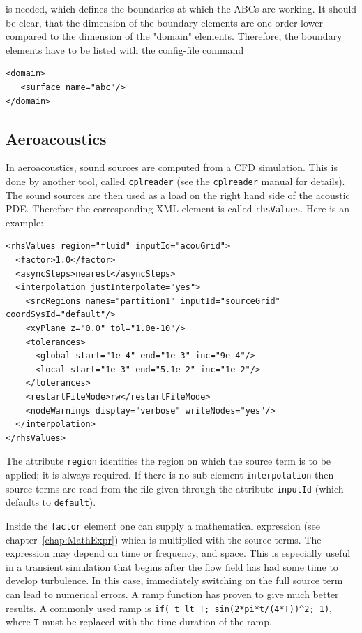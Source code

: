 is needed, which defines the boundaries at which the ABCs are working.
It should be clear, that the dimension of the boundary elements are
one order lower compared to the dimension of the "domain" elements.
Therefore, the boundary elements have to be listed with the config-file
command

\begin{verbatim}
<domain>
   <surface name="abc"/>
</domain>
\end{verbatim}

\subsection{Aeroacoustics}
In aeroacoustics, sound sources are computed from a CFD simulation. This is
done by another tool, called \texttt{cplreader} (see the \texttt{cplreader}
manual for details). The sound sources are then used as a load on the right
hand side of the acoustic PDE. Therefore the corresponding XML element is
called \texttt{rhsValues}. Here is an example:

\begin{verbatim}
<rhsValues region="fluid" inputId="acouGrid">
  <factor>1.0</factor>
  <asyncSteps>nearest</asyncSteps>
  <interpolation justInterpolate="yes">
    <srcRegions names="partition1" inputId="sourceGrid" coordSysId="default"/>
    <xyPlane z="0.0" tol="1.0e-10"/>
    <tolerances>
      <global start="1e-4" end="1e-3" inc="9e-4"/>
      <local start="1e-3" end="5.1e-2" inc="1e-2"/>
    </tolerances>
    <restartFileMode>rw</restartFileMode>
    <nodeWarnings display="verbose" writeNodes="yes"/>
  </interpolation>
</rhsValues>
\end{verbatim}

The attribute \texttt{region} identifies the region on which the source term
is to be applied; it is always required. If there is no sub-element
\texttt{interpolation} then source terms are read from the file given through
the attribute \texttt{inputId} (which defaults to \texttt{default}).

Inside the \texttt{factor} element one can supply a mathematical expression
(see chapter~\ref{chap:MathExpr}) which is multiplied with the source terms.
The expression may depend on time or frequency, and space. This is especially
useful in a transient simulation that begins after the flow field has had some
time to develop turbulence. In this case, immediately switching on the full
source term can lead to numerical errors. A ramp function has proven to give
much better results. A commonly used ramp is
\verb|if( t lt T; sin(2*pi*t/(4*T))^2; 1)|, where \texttt{T} must be replaced
with the time duration of the ramp.

